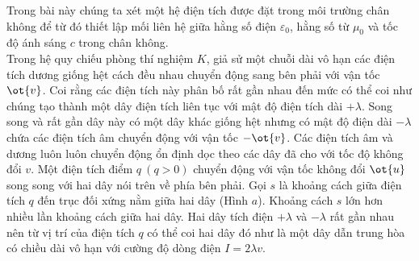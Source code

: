 \begin{vd}
Trong bài này chúng ta xét một hệ điện tích được đặt trong môi trường chân không để từ đó thiết lập mối liên hệ giữa hằng số điện $\varepsilon_{0}$, hằng số từ $\mu_{0}$ và tốc độ ánh sáng $c$ trong chân không.\\
Trong hệ quy chiếu phòng thí nghiệm ${K}$, giả sử một chuỗi dài vô hạn các điện tích dương giống hệt cách đều nhau chuyển động sang bên phải với vận tốc $\ot{v}$. Coi rằng các điện tích này phân bố rất gần nhau đến mức có thể coi như chúng tạo thành một dây điện tích liên tục với mật độ điện tích dài $+\lambda$. Song song và rất gần dây này có một dây khác giống hệt nhưng có mật độ điện dài $-\lambda$ chứa các điện tích âm chuyển động với vận tốc $-\ot{v}$. Các điện tích âm và dương luôn luôn chuyển động ổn định dọc theo các dây đã cho với tốc độ không đổi $v$. Một điện tích điểm ${q}~ ({q} > 0)$ chuyển động với vận tốc không đổi $\ot{u}$ song song với hai dây nói trên về phía bên phải. Gọi $s$ là khoảng cách giữa điện tích ${q}$ đến trục đối xứng nằm giữa hai dây (Hình $a$). Khoảng cách $s$ lớn hơn nhiều lần khoảng cách giữa hai dây. Hai dây tích điện $+\lambda$ và $-\lambda$ rất gần nhau nên từ vị trí của điện tích ${q}$ có thể coi hai dây đó như là một dây dẫn trung hòa có chiều dài vô hạn với cường độ dòng điện ${I}=2 \lambda {v}$.
\begin{center}



\begin{tikzpicture}[x=0.75pt,y=0.75pt,yscale=-1,xscale=1]


\end{tikzpicture}
\end{center}
\end{vd}
